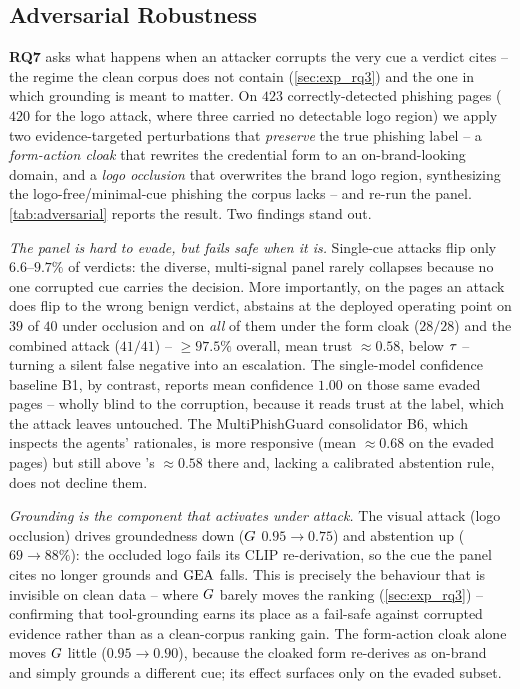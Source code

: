 \subsection{Adversarial Robustness}
\label{sec:exp_adv}
\textbf{RQ7} asks what happens when an attacker corrupts the very cue a verdict cites --
the regime the clean corpus does not contain (\autoref{sec:exp_rq3}) and the one in which
grounding is meant to matter. On $423$ correctly-detected phishing pages ($420$ for the
logo attack, where three carried no detectable logo region) we apply two
evidence-targeted perturbations that \emph{preserve} the true phishing label -- a
\emph{form-action cloak} that rewrites the credential form to an on-brand-looking domain,
and a \emph{logo occlusion} that overwrites the brand logo region, synthesizing the
logo-free/minimal-cue phishing the corpus lacks -- and re-run the panel.
\autoref{tab:adversarial} reports the result. Two findings stand out.

\emph{The panel is hard to evade, but \toolname{} fails safe when it is.} Single-cue
attacks flip only $6.6$--$9.7\%$ of verdicts: the diverse, multi-signal panel rarely
collapses because no one corrupted cue carries the decision. More importantly, on the
pages an attack does flip to the wrong \textsf{benign} verdict, \toolname{} abstains at
the deployed operating point on $39$ of $40$ under occlusion and on \emph{all} of them
under the form cloak ($28/28$) and the combined attack ($41/41$) -- $\ge97.5\%$ overall,
mean trust $\approx0.58$, below $\tau$ -- turning a silent false negative into an
escalation. The single-model confidence baseline B1, by contrast, reports mean confidence
$1.00$ on those same evaded pages -- wholly blind to the corruption, because it reads
trust at the label, which the attack leaves untouched. The MultiPhishGuard consolidator
B6, which inspects the agents' rationales, is more responsive (mean $\approx0.68$ on the
evaded pages) but still above \toolname's $\approx0.58$ there and, lacking a calibrated
abstention rule, does not decline them.

\emph{Grounding is the component that activates under attack.} The visual attack (logo
occlusion) drives groundedness down ($G$ $0.95\to0.75$) and abstention up ($69\to88\%$):
the occluded logo fails its CLIP re-derivation, so the cue the panel cites no longer
grounds and $\mathrm{GEA}$ falls. This is precisely the behaviour that is invisible on clean
data -- where $G$ barely moves the ranking (\autoref{sec:exp_rq3}) -- confirming that
tool-grounding earns its place as a fail-safe against corrupted evidence rather than as a
clean-corpus ranking gain. The form-action cloak alone moves $G$ little ($0.95\to0.90$),
because the cloaked form re-derives as on-brand and simply grounds a different cue; its
effect surfaces only on the evaded subset.

